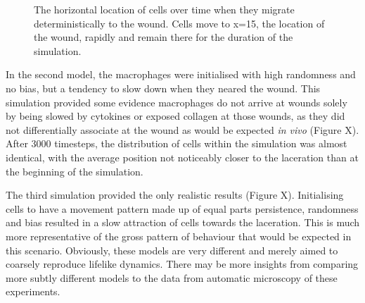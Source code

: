 \documentclass[11.5pt]{article}
\begin{document}
\begin{figure}[H]
\centering
\caption{The horizontal location of cells over time when 
they migrate deterministically to the wound. Cells move to x=15, the 
location of the wound, rapidly and remain there for the duration of the 
simulation.
}
\end{figure}

In the second model, the macrophages were initialised with high 
randomness and no bias, but a tendency to slow down when they neared the 
wound. This simulation provided some evidence macrophages do not arrive 
at wounds solely by being slowed by cytokines or exposed collagen at 
those wounds, as they did not differentially associate at the wound as 
would be expected {\itshape in vivo} (Figure X). After 3000 timesteps, 
the distribution of cells within the simulation was almost identical, 
with the average position not noticeably closer to the laceration than 
at the beginning of the simulation.\begin{figure}[H]
\centering
\end{figure}

The third simulation provided the only realistic results (Figure X). 
Initialising cells to have a movement pattern made up of equal parts 
persistence, randomness and bias resulted in a slow attraction of cells 
towards the laceration. This is much more representative of the gross 
pattern of behaviour that would be expected in this scenario. Obviously, 
these models are very different and merely aimed to coarsely reproduce 
lifelike dynamics. There may be more insights from comparing more subtly 
different models to the data from automatic microscopy of these 
experiments.

\begin{figure}[H]
\centering
\end{figure}
\end{document}
